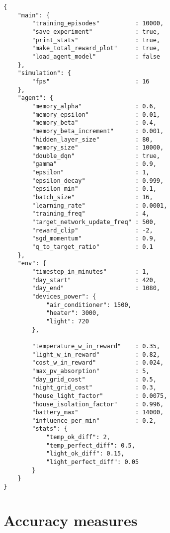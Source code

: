 \documentclass{article}
\begin{document}
\begin{lstlisting}
{
    "main": {
        "training_episodes"          : 10000,
        "save_experiment"            : true,
        "print_stats"                : true,
        "make_total_reward_plot"     : true,
        "load_agent_model"           : false
    },
    "simulation": {
        "fps"                        : 16
    },
    "agent": {
    	"memory_alpha"               : 0.6,
        "memory_epsilon"             : 0.01,
        "memory_beta"                : 0.4,
        "memory_beta_increment"      : 0.001,
        "hidden_layer_size"          : 80,
        "memory_size"                : 10000,
        "double_dqn"                 : true,
        "gamma"                      : 0.9,
        "epsilon"                    : 1,
        "epsilon_decay"              : 0.999,
        "epsilon_min"                : 0.1,
        "batch_size"                 : 16,
        "learning_rate"              : 0.0001,
        "training_freq"              : 4,
        "target_network_update_freq" : 500,
        "reward_clip"                : -2,
        "sgd_momentum"               : 0.9,
        "q_to_target_ratio"          : 0.1
    },
    "env": {
        "timestep_in_minutes"        : 1,
        "day_start"                  : 420,
        "day_end"                    : 1080,
        "devices_power": {
            "air_conditioner": 1500,
            "heater": 3000,
            "light": 720
        },

        "temperature_w_in_reward"    : 0.35,
        "light_w_in_reward"          : 0.82,
        "cost_w_in_reward"           : 0.024,
        "max_pv_absorption"          : 5,
        "day_grid_cost"              : 0.5,
        "night_grid_cost"            : 0.3,
        "house_light_factor"         : 0.0075,
        "house_isolation_factor"     : 0.996,
        "battery_max"                : 14000,
        "influence_per_min"          : 0.2,
        "stats": {
            "temp_ok_diff": 2,
            "temp_perfect_diff": 0.5,
            "light_ok_diff": 0.15,
            "light_perfect_diff": 0.05
        }
    }
}
\end{lstlisting}

\section{Accuracy measures}
\end{document}

